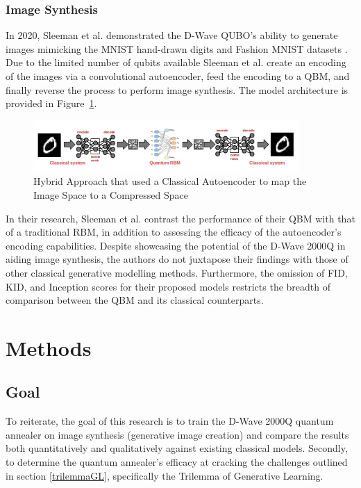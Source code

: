 \documentclass[%
 reprint,
 amsmath,amssymb,
 aps,
]{revtex4-2}
\begin{document}
\subsubsection{Image Synthesis}
In 2020, Sleeman et al. demonstrated the D-Wave QUBO's ability to generate images mimicking the MNIST hand-drawn digits and Fashion MNIST datasets \cite{qmlimggen}. Due to the limited number of qubits available Sleeman et al. create an encoding of the images via a convolutional autoencoder, feed the encoding to a QBM, and finally reverse the process to perform image synthesis. The model architecture is provided in Figure~\ref{fig:hybridML}.

\begin{figure}
    \includegraphics[width=0.9\textwidth]{qmlimgimg.png}
    \caption{\label{fig:hybridML} Hybrid Approach that used a Classical Autoencoder to map the Image Space to a Compressed Space \cite{qmlimggen}}
\end{figure}


In their research, Sleeman et al. contrast the performance of their QBM with that of a traditional RBM, in addition to assessing the efficacy of the autoencoder's encoding capabilities. Despite showcasing the potential of the D-Wave 2000Q in aiding image synthesis, the authors do not juxtapose their findings with those of other classical generative modelling methods. Furthermore, the omission of FID, KID, and Inception scores for their proposed models restricts the breadth of comparison between the QBM and its classical counterparts.

\section{Methods}
\subsection{Goal}
To reiterate, the goal of this research is to train the D-Wave 2000Q quantum annealer on image synthesis (generative image creation) and compare the results both quantitatively and qualitatively against existing classical models. Secondly, to determine the quantum annealer's efficacy at cracking the challenges outlined in section \ref{trilemmaGL}, specifically the Trilemma of Generative Learning. 
\end{document}
